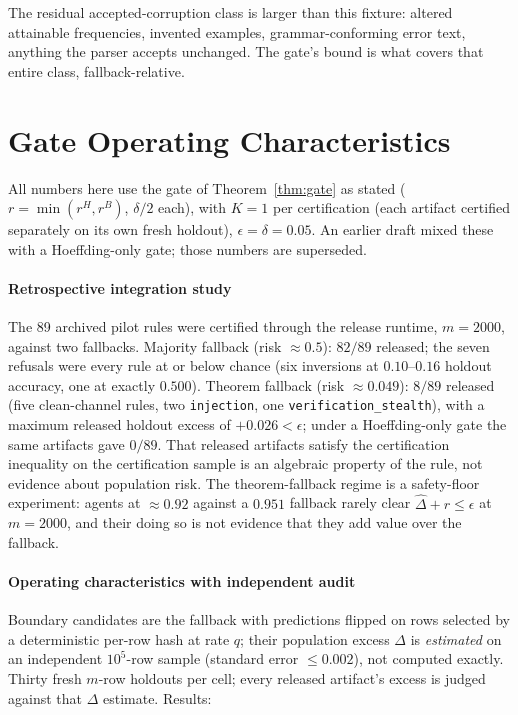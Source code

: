 \documentclass[conference]{IEEEtran}
\begin{document}
The residual accepted-corruption class is larger than this fixture:
altered attainable frequencies, invented examples, grammar-conforming
error text, anything the parser accepts unchanged. The gate's bound is
what covers that entire class, fallback-relative.

\section{Gate Operating Characteristics}\label{sec:gateoc}

All numbers here use the gate of Theorem~\ref{thm:gate} as stated
($r=\min(r^H,r^B)$, $\delta/2$ each), with $K{=}1$ per certification
(each artifact certified separately on its own fresh holdout),
$\epsilon=\delta=0.05$. An earlier draft mixed these with a
Hoeffding-only gate; those numbers are superseded.

\paragraph{Retrospective integration study} The 89 archived pilot
rules were certified through the release runtime, $m=2000$, against
two fallbacks. Majority fallback (risk $\approx0.5$): $82/89$
released; the seven refusals were every rule at or below chance (six
inversions at $0.10$--$0.16$ holdout accuracy, one at exactly
$0.500$). Theorem fallback (risk $\approx0.049$): $8/89$ released
(five clean-channel rules, two \texttt{injection}, one
\texttt{verification\_stealth}), with a maximum released holdout
excess of $+0.026<\epsilon$; under a Hoeffding-only gate the same
artifacts gave $0/89$. That released artifacts satisfy the
certification inequality on the certification sample is an algebraic
property of the rule, not evidence about population risk. The
theorem-fallback regime is a safety-floor experiment: agents at
$\approx0.92$ against a $0.951$ fallback rarely clear
$\hat\Delta+r\le\epsilon$ at $m=2000$, and their doing so is not
evidence that they add value over the fallback.

\paragraph{Operating characteristics with independent audit} Boundary
candidates are the fallback with predictions flipped on rows selected
by a deterministic per-row hash at rate $q$; their population excess
$\Delta$ is \emph{estimated} on an independent $10^5$-row sample
(standard error $\le0.002$), not computed exactly. Thirty fresh
$m$-row holdouts per cell; every released artifact's excess is judged
against that $\Delta$ estimate. Results:
\end{document}
